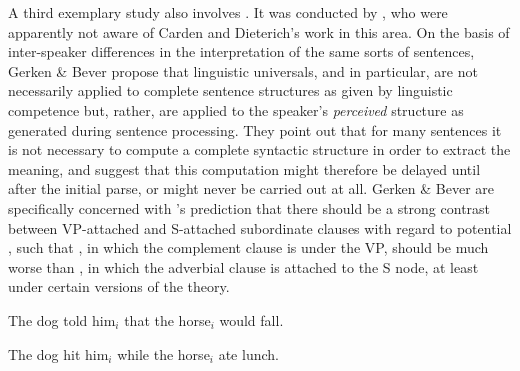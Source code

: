A third exemplary study also involves . It was conducted by \citet{GerkenEtAl1986}, who were apparently not aware of Carden
and Dieterich's work in this area. On the basis of inter-speaker differences in the interpretation of the same sorts of sentences, Gerken \& Bever propose that linguistic universals, and  in particular, are not necessarily applied to complete sentence structures as given by linguistic competence but, rather, are applied to the speaker's \textit{perceived} structure as generated during sentence processing. They point out that for many sentences it is not necessary to compute a complete syntactic structure in order to extract the meaning, and suggest that this computation might therefore be delayed until after the initial parse, or might never be carried out at all. Gerken \& Bever are specifically concerned with 's prediction that there should be a strong contrast between VP-attached and S-attached subordinate clauses with regard to potential , such that , in which the complement clause is under the VP, should be much worse than , in which the adverbial clause is attached to the S node, at least under certain versions of the theory.


\ea\label{ex:1:4}
The dog told him$_i$ that the horse$_i$ would fall.
\z


\ea\label{ex:1:5}
The dog hit him$_i$ while the horse$_i$ ate lunch.
\z

